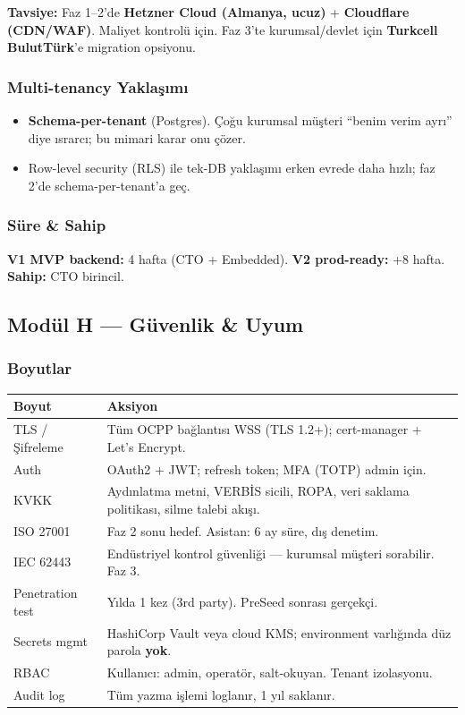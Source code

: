 \documentclass[11pt,a4paper]{article}
\begin{document}
\textbf{Tavsiye:} Faz 1--2'de \textbf{Hetzner Cloud (Almanya, ucuz)} + \textbf{Cloudflare (CDN/WAF)}. Maliyet kontrolü için. Faz 3'te kurumsal/devlet için \textbf{Turkcell BulutTürk}'e migration opsiyonu.

\subsubsection{Multi-tenancy Yaklaşımı}
\begin{itemize}
    \item \textbf{Schema-per-tenant} (Postgres). Çoğu kurumsal müşteri ``benim verim ayrı'' diye ısrarcı; bu mimari karar onu çözer.
    \item Row-level security (RLS) ile tek-DB yaklaşımı erken evrede daha hızlı; faz 2'de schema-per-tenant'a geç.
\end{itemize}

\subsubsection{Süre \& Sahip}
\textbf{V1 MVP backend:} 4 hafta (CTO + Embedded). \textbf{V2 prod-ready:} +8 hafta. \textbf{Sahip:} CTO birincil.

\subsection{Modül H — Güvenlik \& Uyum}

\subsubsection{Boyutlar}

\begin{tabularx}{\textwidth}{l X}
\toprule
\textbf{Boyut} & \textbf{Aksiyon} \\
\midrule
TLS / Şifreleme & Tüm OCPP bağlantısı WSS (TLS 1.2+); cert-manager + Let's Encrypt. \\
Auth & OAuth2 + JWT; refresh token; MFA (TOTP) admin için. \\
KVKK & Aydınlatma metni, VERBİS sicili, ROPA, veri saklama politikası, silme talebi akışı. \\
ISO 27001 & Faz 2 sonu hedef. Asistan: 6 ay süre, dış denetim. \\
IEC 62443 & Endüstriyel kontrol güvenliği — kurumsal müşteri sorabilir. Faz 3. \\
Penetration test & Yılda 1 kez (3rd party). PreSeed sonrası gerçekçi. \\
Secrets mgmt & HashiCorp Vault veya cloud KMS; environment varlığında düz parola \textbf{yok}. \\
RBAC & Kullanıcı: admin, operatör, salt-okuyan. Tenant izolasyonu. \\
Audit log & Tüm yazma işlemi loglanır, 1 yıl saklanır. \\
\bottomrule
\end{tabularx}
\end{document}
